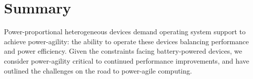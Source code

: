 \section{Summary}

Power-proportional heterogeneous devices demand operating system support to
achieve power-agility: the ability to operate these devices balancing
performance and power efficiency. Given the constraints facing
battery-powered devices, we consider power-agility critical to continued
performance improvements, and have outlined the challenges on the road to
power-agile computing.
